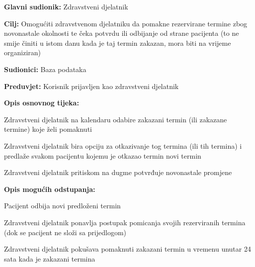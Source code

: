 					
					\noindent {}
					\begin{packed_item}
						
						\item \textbf{Glavni sudionik: }Zdravstveni djelatnik
						\item  \textbf{Cilj:} Omogućiti zdravstvenom djelatniku da pomakne rezervirane termine zbog novonastale okolnosti te čeka potvrdu ili odbijanje od strane pacijenta (to ne smije činiti u istom danu kada je taj termin zakazan, mora biti na vrijeme organiziran)
						\item  \textbf{Sudionici:} Baza podataka
						\item  \textbf{Preduvjet:} Korisnik prijavljen kao zdravstveni djelatnik
						\item  \textbf{Opis osnovnog tijeka:}
						
						\item[] \begin{packed_enum}
							
							\item Zdravstveni djelatnik na kalendaru odabire zakazani termin (ili zakazane termine) koje želi pomaknuti
							\item Zdravstveni djelatnik bira opciju za otkazivanje tog termina (ili tih termina) i predlaže svakom pacijentu kojemu je otkazao termin novi termin
							\item Zdravstveni djelatnik pritiskom na dugme potvrđuje novonastale promjene
						\end{packed_enum}
						
						\item  \textbf{Opis mogućih odstupanja:}
						
						\item[] \begin{packed_item}
							
							\item[2.a] Pacijent odbija novi predloženi termin
							\item[] \begin{packed_enum}
								
								\item Zdravstveni djelatnik ponavlja postupak pomicanja svojih rezerviranih termina (dok se pacijent ne složi sa prijedlogom)
								
							\end{packed_enum}
							\item[2.a] Zdravstveni djelatnik pokušava pomaknuti zakazani termin u vremenu unutar 24 sata kada je zakazani termina
							\item[] \begin{packed_enum}
								

\end{packed_enum}
\end{packed_item}
\end{packed_item}
